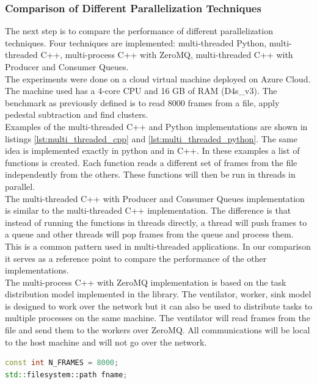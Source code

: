 \begin{spacing}{1.2}
    \subsubsection{Comparison of Different Parallelization Techniques}
    The next step is to compare the performance of different parallelization techniques. Four techniques are
    implemented: multi-threaded Python, multi-threaded C++, multi-process C++ with ZeroMQ, multi-threaded C++ with
    Producer and Consumer Queues.\\

    The experiments were done on a cloud virtual machine deployed on Azure Cloud. The machine used has a 4-core CPU and 16
    GB of RAM (D4s\_v3). The benchmark as previously defined is to read 8000 frames from a file, apply pedestal subtraction and
    find clusters.    \\

    Examples of the multi-threaded C++ and Python implementations are shown in listings \ref{lst:multi_threaded_cpp} and
    \ref{lst:multi_threaded_python}. The same idea is implemented exactly in python and in C++. In these examples
    a list of functions is created. Each function reads a different set of frames from the file independently from
    the others. These functions will then be run in threads in parallel.\\

    The multi-threaded C++ with Producer and Consumer Queues implementation is similar to the multi-threaded C++ implementation.
    The difference is that instead of running the functions in threads directly, a thread will push frames to a queue and
    other threads will pop frames from the queue and process them. This is a common pattern used in multi-threaded applications.
    In our comparison it serves as a reference point to compare the performance of the other implementations.\\

    The multi-process C++ with ZeroMQ implementation is based on the task distribution model implemented in the library.
    The ventilator, worker, sink model is designed to work over the network but it can also be used to distribute tasks
    to multiple processes on the same machine. The ventilator will read frames from the file and send them to the workers
    over ZeroMQ. All communications will be local to the host machine and will not go over the network.\\


    \begin{lstlisting}[language=C++, caption=Multi-threaded C++ example, label=lst:multi_threaded_cpp]
const int N_FRAMES = 8000;
std::filesystem::path fname;


\end{lstlisting}
\end{spacing}
